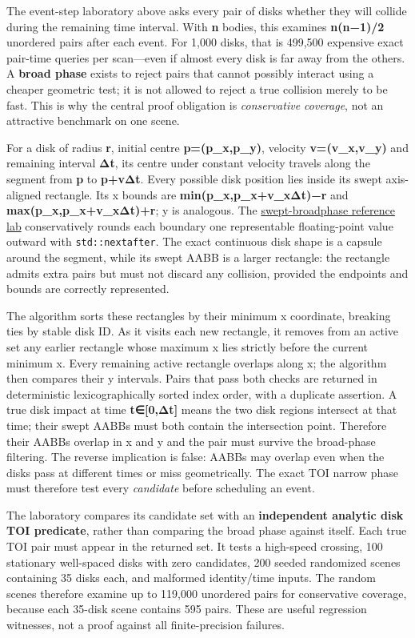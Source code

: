 The event-step laboratory above asks every pair of disks whether they will collide during the remaining time interval. With \textbf{n} bodies, this examines \textbf{n(n−1)/2} unordered pairs after each event. For 1,000 disks, that is 499,500 expensive exact pair-time queries per scan---even if almost every disk is far away from the others. A \textbf{broad phase} exists to reject pairs that cannot possibly interact using a cheaper geometric test; it is not allowed to reject a true collision merely to be fast. This is why the central proof obligation is \emph{conservative coverage}, not an attractive benchmark on one scene.

For a disk of radius \textbf{r}, initial centre \textbf{p=(p\_x,p\_y)}, velocity \textbf{v=(v\_x,v\_y)} and remaining interval \textbf{Δt}, its centre under constant velocity travels along the segment from \textbf{p} to \textbf{p+vΔt}. Every possible disk position lies inside its swept axis-aligned rectangle. Its x bounds are \textbf{min(p\_x,p\_x+v\_xΔt)−r} and \textbf{max(p\_x,p\_x+v\_xΔt)+r}; y is analogous. The \hyperref[source-file-6597829be009fc0bb1b17d87]{swept-broadphase reference lab} conservatively rounds each boundary one representable floating-point value outward with \texttt{std::nextafter}. The exact continuous disk shape is a capsule around the segment, while its swept AABB is a larger rectangle: the rectangle admits extra pairs but must not discard any collision, provided the endpoints and bounds are correctly represented.

The algorithm sorts these rectangles by their minimum x coordinate, breaking ties by stable disk ID. As it visits each new rectangle, it removes from an active set any earlier rectangle whose maximum x lies strictly before the current minimum x. Every remaining active rectangle overlaps along x; the algorithm then compares their y intervals. Pairs that pass both checks are returned in deterministic lexicographically sorted index order, with a duplicate assertion. A true disk impact at time \textbf{t∈{[}0,Δt{]}} means the two disk regions intersect at that time; their swept AABBs must both contain the intersection point. Therefore their AABBs overlap in x and y and the pair must survive the broad-phase filtering. The reverse implication is false: AABBs may overlap even when the disks pass at different times or miss geometrically. The exact TOI narrow phase must therefore test every \emph{candidate} before scheduling an event.

The laboratory compares its candidate set with an \textbf{independent analytic disk TOI predicate}, rather than comparing the broad phase against itself. Each true TOI pair must appear in the returned set. It tests a high-speed crossing, 100 stationary well-spaced disks with zero candidates, 200 seeded randomized scenes containing 35 disks each, and malformed identity/time inputs. The random scenes therefore examine up to 119,000 unordered pairs for conservative coverage, because each 35-disk scene contains 595 pairs. These are useful regression witnesses, not a proof against all finite-precision failures.

